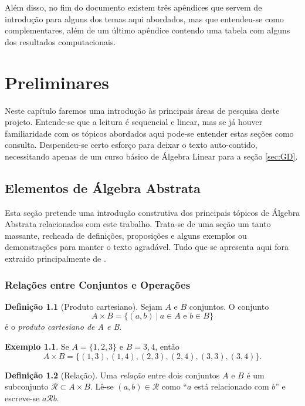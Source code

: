 \documentclass[a4paper,12pt]{report}
\theoremstyle{plain}
\theoremstyle{definition}
\newtheorem{definicao}{Definição}[section]
\newtheorem{exemplo}{Exemplo}[section]
\begin{document}
	Além disso, no fim do documento existem três apêndices que servem de introdução para alguns dos temas aqui abordados, mas que entendeu-se como complementares, além de um último apêndice contendo uma tabela com alguns dos resultados computacionais.
	
	\newpage
	
	\chapter{Preliminares\label{sec:preliminares}}
	Neste capítulo faremos uma introdução às principais áreas de pesquisa deste projeto. Entende-se que a leitura é sequencial e linear, mas se já houver familiaridade com os tópicos abordados aqui pode-se entender estas seções como consulta. Despendeu-se certo esforço para deixar o texto auto-contido, necessitando apenas de um curso básico de Álgebra Linear para a seção \ref{sec:GD}.
	
	
	\section{Elementos de Álgebra Abstrata\label{sec:algebra}}
	
	Esta seção pretende uma introdução construtiva dos principais tópicos de Álgebra Abstrata relacionados com este trabalho. Trata-se de uma seção um tanto massante, recheada de definições, proposições e alguns exemplos ou demonstrações para manter o texto agradável. Tudo que se apresenta aqui fora extraído principalmente de \cite{fraleigh2003first,michalAlgebra,dummit1991abstract,van1949modern}.
	
	\subsection{Relações entre Conjuntos e Operações}
	
	\begin{definicao}[Produto cartesiano]
		Sejam $A$ e $B$ conjuntos. O conjunto $$A\times B = \{(a,b) \ | \ a\in A \text{ e } b\in B\}$$
		é o \emph{produto cartesiano de A e B}.
	\end{definicao}
	
	\begin{exemplo}
		Se $A = \{1,2,3\}$ e $B = {3,4}$, então $$A\times B = \{(1,3),(1,4),(2,3),(2,4),(3,3),(3,4)\}.$$
	\end{exemplo}
	
	\begin{definicao}[Relação]
		Uma	\emph{relação} entre dois conjuntos $A$ e $B$ é um subconjunto $\mathcal{R}\subset A\times B$. Lê-se $(a,b) \in \mathcal{R}$ como ``$a$ está relacionado com $b$'' e escreve-se $a\mathcal{R}b$.
	\end{definicao}
	
\end{document}
